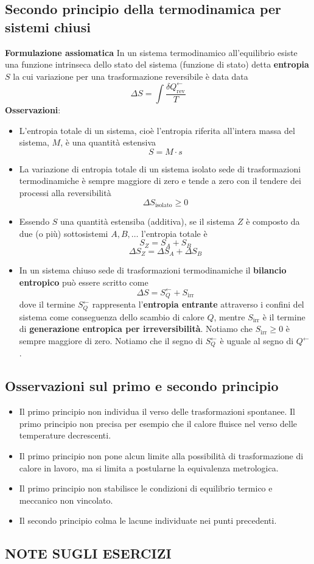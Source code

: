 \subsection{Secondo principio della termodinamica per sistemi chiusi}
\textbf{Formulazione assiomatica}\newline
In un sistema termodinamico all’equilibrio esiste una funzione intrinseca dello stato del sistema (funzione di stato) detta \textbf{entropia} $S$ la cui variazione per una trasformazione reversibile è data data
\[
    \Delta S = \int \frac{\delta Q_{\text{rev}}^\leftarrow }{T}
\]
\textbf{Osservazioni}:
\begin{itemize}
    \item L’entropia totale di un sistema, cioè l’entropia riferita all’intera massa del sistema, $M$, è una quantità estensiva
    \[
        S = M \cdot s
    \]
    \item La variazione di entropia totale di un sistema isolato sede di trasformazioni termodinamiche è sempre maggiore di zero e tende a zero con il tendere dei processi alla reversibilità
    \[
        \Delta S_{\text{isolato}} \geq 0
    \]
    \item Essendo $S$ una quantità estensiba (additiva), se il sistema $Z$ è composto da due (o più) sottosistemi $A, B, \dots$ l'entropia totale è
    \[
        S_Z = S_A + S_B
    \]
    \[
        \Delta S_Z = \Delta S_A + \Delta S_B
    \]
    \item In un sistema chiuso sede di trasformazioni termodinamiche il \textbf{bilancio entropico} può essere scritto come
    \[
        \Delta S = S_Q^\leftarrow + S_{\text{irr}}
    \]
    dove il termine $S_Q^\leftarrow$ rappresenta l'\textbf{entropia entrante} attraverso i confini del sistema come conseguenza dello scambio di calore $Q$, mentre $S_{\text{irr}}$ è il termine di \textbf{generazione entropica per irreversibilità}.\newline
    \newline
    Notiamo che $S_{\text{irr}} \geq 0$ è sempre maggiore di zero.\newline
    Notiamo che il segno di $S_Q^\leftarrow$ è uguale al segno di $Q^\leftarrow $.
\end{itemize}
\subsection{Osservazioni sul primo e secondo principio}
\begin{itemize}
    \item Il primo principio non individua il verso delle trasformazioni spontanee. Il primo principio non precisa per esempio che il calore fluisce nel verso delle temperature decrescenti.
    \item Il primo principio non pone alcun limite alla possibilità di trasformazione di calore in lavoro, ma
    si limita a postularne la equivalenza metrologica.
    \item Il primo principio non stabilisce le condizioni di equilibrio termico e meccanico non vincolato.
    \item Il secondo principio colma le lacune individuate nei punti precedenti.
\end{itemize}
\subsection{NOTE SUGLI ESERCIZI}